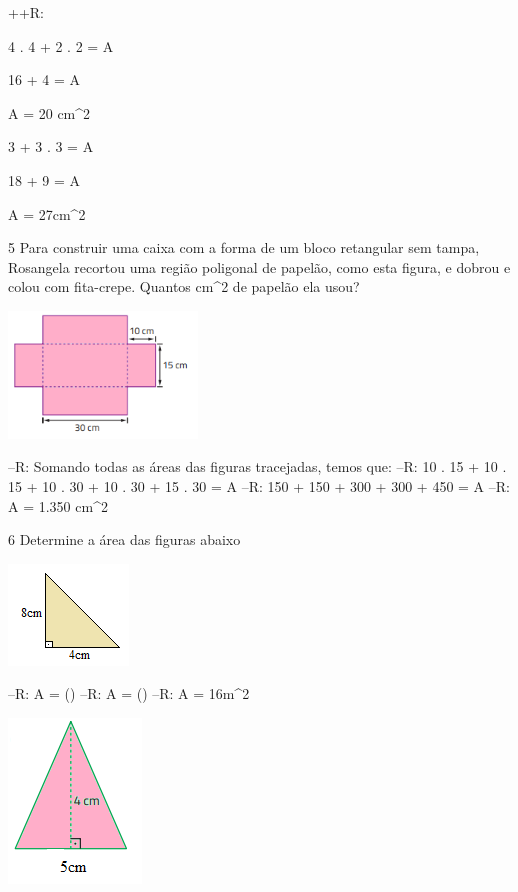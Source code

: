 {++R:
\item

4 . 4 + 2 . 2 = A

16 + 4 = A

A = 20 cm^2
\item

3 + 3 . 3 = A

18 + 9 = A

A = 27cm^2

\num{5} Para construir uma caixa com a forma de um bloco retangular sem
tampa, Rosangela recortou uma região poligonal de papelão, como esta
figura, e dobrou e colou com fita-crepe. Quantos cm^2 de papelão ela
usou?

\includegraphics[width=1.98333in,height=1.33255in]{./imgSAEB_8_MAT/media/image45.png}

--R: Somando todas as áreas das figuras tracejadas, temos que:
--R: 10 . 15 + 10 . 15 + 10 . 30 + 10 . 30 + 15 . 30 = A
--R: 150 + 150 + 300 + 300 + 450 = A
--R: A = 1.350 cm^2

\num{6} Determine a área das figuras abaixo
\item
\includegraphics[width=1.26042in,height=1.0625in]{./imgSAEB_8_MAT/media/image46.png}

--R: A = ()
--R: A = ()
--R: A = 16m^2

\item
\includegraphics[width=1.39583in,height=1.72917in]{./imgSAEB_8_MAT/media/image47.png}

}
